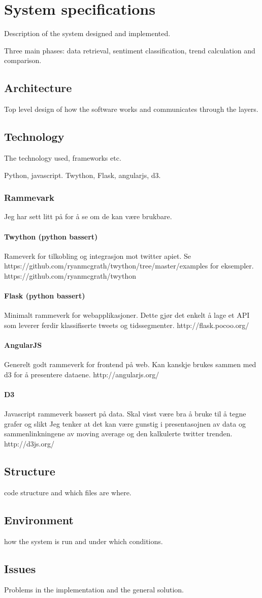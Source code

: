 \section{System specifications}
Description of the system designed and implemented. 

Three main phases: data retrieval, sentiment classification, trend calculation
and comparison. 

\subsection{Architecture}
Top level design of how the software works and communicates through the layers. 
\subsection{Technology}
The technology used, frameworks etc. 

Python, javascript. 
Twython, Flask, angularjs, d3. 

\subsubsection{Rammevark} 
Jeg har sett litt på for å se om de kan være brukbare. 

\paragraph{Twython (python bassert)}
Rameverk for tilkobling og integrasjon mot twitter apiet. 
Se https://github.com/ryanmcgrath/twython/tree/master/examples for eksempler. 
https://github.com/ryanmcgrath/twython

\paragraph{Flask (python bassert)}
Minimalt rammeverk for webapplikasjoner. Dette gjør det enkelt å lage et API som
leverer ferdir klassifiserte tweets og tidssegmenter. 
http://flask.pocoo.org/

\paragraph{AngularJS}
Generelt godt rammeverk for frontend på web. Kan kanskje brukes sammen med d3
for å presentere dataene. 
http://angularjs.org/

\paragraph{D3}
Javascript rammeverk bassert på data. 
Skal visst være bra å bruke til å tegne grafer og slikt
Jeg tenker at det kan være gunstig i presentasojnen av data og sammenlinkningene
av moving average og den kalkulerte twitter trenden. 
http://d3js.org/

\subsection{Structure}
code structure and which files are where. 
\subsection{Environment}
how the system is run and under which conditions.
\subsection{Issues}
Problems in the implementation and the general solution. 
